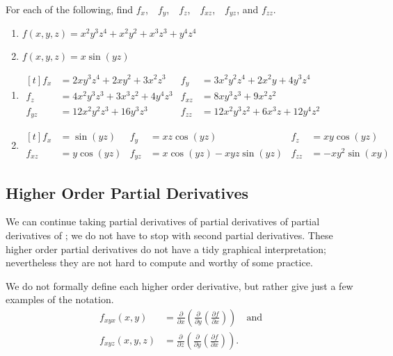 \begin{example}\label{ex_partial8}
For each of the following, find $f_x$,\ \ $f_y$,\ \ $f_z$,\ \  $f_{xz}$,\ \  $f_{yz}$, and $f_{zz}$.
\begin{enumerate}
	\item $f(x,y,z) = x^2y^3z^4+x^2y^2+x^3z^3+y^4z^4$
	\item	$f(x,y,z) = x\sin (yz)$
\end{enumerate}
\solution
\begin{enumerate}
	\item\hfill$\begin{aligned}[t]
	f_x &= 2xy^3z^4+2xy^2+3x^2z^3 & f_y &= 3x^2y^2z^4+2x^2y+4y^3z^4 \\
	f_z &= 4x^2y^3z^3+3x^3z^2+4y^4z^3 & f_{xz} &= 8xy^3z^3+9x^2z^2 \\
	f_{yz} &= 12x^2y^2z^3+16y^3z^3 & f_{zz} &= 12x^2y^3z^2+6x^3z+12y^4z^2
	\end{aligned}$\hfill\null

	\item\hfill$\begin{aligned}[t]
	f_x &= \sin(yz) & f_y &= xz\cos(yz) & f_z &= xy\cos(yz) \\
	f_{xz} &= y\cos(yz) & f_{yz} &= x\cos(yz) - xyz\sin(yz) & f_{zz} &= -xy^2\sin(xy)
	\end{aligned}$\hfill\null
\end{enumerate}
\end{example}

\subsection{Higher Order Partial Derivatives}

We can continue taking partial derivatives of partial derivatives of partial derivatives of \dotso; we do not have to stop with second partial derivatives. These higher order partial derivatives do not have a tidy graphical interpretation; nevertheless they are not hard to compute and worthy of some practice. 

We do not formally define each higher order derivative, but rather give just a few examples of the notation.
\begin{align*}
f_{xyx}(x,y) &=\frac{\partial}{\partial x}\left(\frac{\partial}{\partial y}\left(\frac{\partial f}{\partial x}\right)\right) \quad \text{and}\\
f_{xyz}(x,y,z) &=\frac{\partial}{\partial z}\left(\frac{\partial}{\partial y}\left(\frac{\partial f}{\partial x}\right)\right).
\end{align*}

